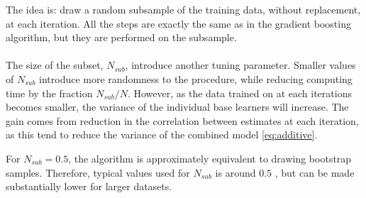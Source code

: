 The idea is: draw a random subsample of the training data, without replacement, at each iteration. All the steps are exactly the same as in the gradient boosting algorithm, but they are performed on the subsample. \\
\\
The size of the subset, $N_{sub}$, introduce another tuning parameter. Smaller values of $N_{sub}$ introduce more randomness to the procedure, while reducing computing time by the fraction $N_{sub}/N$. However, as the data trained on at each iterations becomes smaller, the variance of the individual base learners will increase. The gain comes from reduction in the correlation between estimates at each iteration, as this tend to reduce the variance of the combined model \eqref{eq:additive}.

For $N_{sub} = 0.5$, the algorithm is approximately equivalent to drawing bootstrap samples. Therefore, typical values used for $N_{sub}$ is around $0.5$ \cite{modstat}, but can be made substantially lower for larger datasets.

